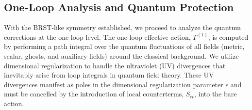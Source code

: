 \documentclass[twocolumn]{aastex631}
\begin{document}
\subsection{One-Loop Analysis and Quantum Protection}

With the BRST-like symmetry established, we proceed to analyze the quantum corrections at the one-loop level. The one-loop effective action, $\Gamma^{(1)}$, is computed by performing a path integral over the quantum fluctuations of all fields (metric, scalar, ghosts, and auxiliary fields) around the classical background. We utilize dimensional regularization to handle the ultraviolet (UV) divergences that inevitably arise from loop integrals in quantum field theory. These UV divergences manifest as poles in the dimensional regularization parameter $\epsilon$ and must be cancelled by the introduction of local counterterms, $S_{ct}$, into the bare action.
\end{document}
